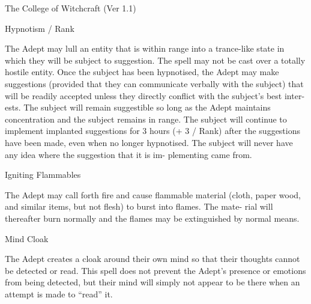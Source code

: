 \begin{Chapter}{The College of Witchcraft (Ver 1.1)}
\begin{spell}[G-6]{Hypnotism }
/ Rank 
\begin{effects}
The Adept may lull an entity that is within 
range into a trance-like state in which they will be 
subject  to  suggestion.  The  spell  may  not  be  cast 
over  a  totally  hostile  entity.  Once  the  subject  has 
been hypnotised, the Adept may make suggestions 
(provided that they can communicate verbally with 
the  subject)  that  will  be  readily  accepted  unless 
they  directly  conflict  with  the  subject’s  best  inter-
ests. The subject will remain suggestible so long as 
the  Adept  maintains  concentration  and  the  subject 
remains  in  range.  The  subject  will  continue  to 
implement implanted suggestions for 3 hours (+ 3 / 
Rank)  after  the  suggestions have  been  made,  even 
when no longer hypnotised. The subject will never 
have  any  idea  where  the  suggestion  that  it  is  im-
plementing came from. 

\end{effects}
\end{spell}

\begin{spell}[G-7]{Igniting Flammables }

\begin{effects}
 The  Adept  may  call  forth  fire  and  cause 
flammable material (cloth, paper wood, and similar 
items, but not flesh) to burst into flames. The mate-
rial  will  thereafter  burn  normally  and  the  flames 
may be extinguished by normal means. 

\end{effects}
\end{spell}

\begin{spell}[G-8]{Mind Cloak }

\begin{effects}
 The  Adept  creates  a  cloak  around  their 
own mind so that their thoughts cannot be detected 
or  read.  This  spell  does  not  prevent  the  Adept’s 
presence or emotions from being detected, but their 
mind  will  simply  not  appear  to  be  there  when  an 
attempt is made to “read” it. 
\end{effects}
\end{spell}


\end{Chapter}
